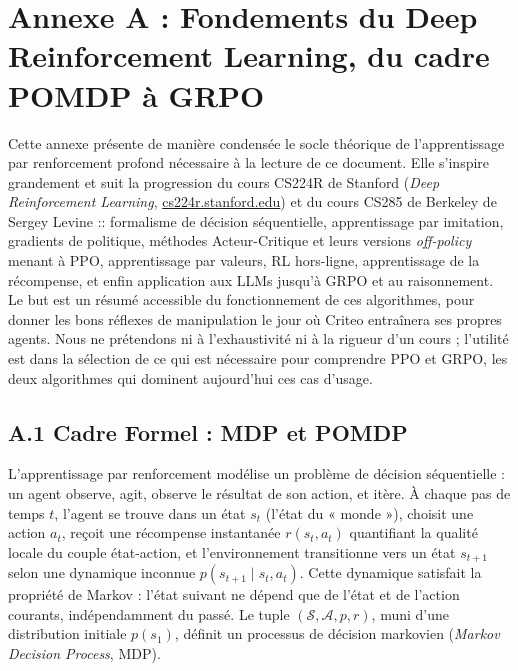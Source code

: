 \documentclass[11pt,a4paper]{article}
\begin{document}
\appendix



\newpage
\section{Annexe A : Fondements du Deep Reinforcement Learning, du cadre POMDP à GRPO}
\label{annexe:maths_rl}

Cette annexe présente de manière condensée le socle théorique de l'apprentissage par renforcement profond nécessaire à la lecture de ce document. Elle s'inspire grandement et suit la progression du cours CS224R de Stanford (\emph{Deep Reinforcement Learning}, \href{https://cs224r.stanford.edu/}{cs224r.stanford.edu}) et du cours CS285 de Berkeley de Sergey Levine :: formalisme de décision séquentielle, apprentissage par imitation, gradients de politique, méthodes Acteur-Critique et leurs versions \emph{off-policy} menant à PPO, apprentissage par valeurs, RL hors-ligne, apprentissage de la récompense, et enfin application aux LLMs jusqu'à GRPO et au raisonnement. Le but est un résumé accessible du fonctionnement de ces algorithmes, pour donner les bons réflexes de manipulation le jour où Criteo entraînera ses propres agents. Nous ne prétendons ni à l'exhaustivité ni à la rigueur d'un cours ; l'utilité est dans la sélection de ce qui est nécessaire pour comprendre PPO et GRPO, les deux algorithmes qui dominent aujourd'hui ces cas d'usage.


\subsection*{A.1 Cadre Formel : MDP et POMDP}
L'apprentissage par renforcement modélise un problème de décision séquentielle : un agent observe, agit, observe le résultat de son action, et itère. À chaque pas de temps $t$, l'agent se trouve dans un état $s_t$ (l'état du « monde »), choisit une action $a_t$, reçoit une récompense instantanée $r(s_t, a_t)$ quantifiant la qualité locale du couple état-action, et l'environnement transitionne vers un état $s_{t+1}$ selon une dynamique inconnue $p(s_{t+1} \mid s_t, a_t)$. Cette dynamique satisfait la propriété de Markov : l'état suivant ne dépend que de l'état et de l'action courants, indépendamment du passé. Le tuple $(\mathcal{S}, \mathcal{A}, p, r)$, muni d'une distribution initiale $p(s_1)$, définit un processus de décision markovien (\emph{Markov Decision Process}, MDP).
\end{document}
